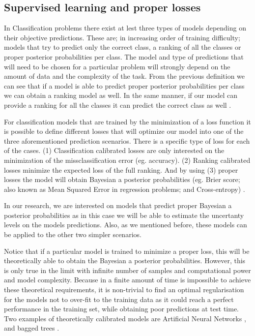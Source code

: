 \documentclass[a4paper, 12pt]{article}
\begin{document}
\subsection{Supervised learning and proper losses}
\label{sec:full:sup}

In Classification problems there exist at lest three types of models depending on their objective predictions.
These are; in increasing order of training difficulty; models that try to predict only the correct class, a ranking of all the classes or proper posterior probabilities per class.
The model and type of predictions that will need to be chosen for a particular problem will strongly depend on the amount of data and the complexity of the task.
From the previous definition we can see that if a model is able to predict proper posterior probabilities per class we can obtain a ranking model as well.
In the same manner, if our model can provide a ranking for all the classes it can predict the correct class as well \cite{Cid-sueiro2012}.

For classification models that are trained by the minimization of a loss function it is possible to define different losses that will optimize our model into one of the three aforementioned prediction scenarios.
There is a specific type of loss for each of the cases. (1) Classification calibrated losses are only interested on the minimization of the missclassification error (eg. accuracy).
(2) Ranking calibrated losses minimize the expected loss of the full ranking.
And by using (3) proper losses the model will obtain Bayesian a posterior probabilities (eg. Brier score; also known as Mean Squared Error in regression problems; and Cross-entropy) \cite{Buja2005}.

In our research, we are interested on models that predict proper Bayesian a posterior probabilities as in this case we will be able to estimate the uncertanty levels on the models predictions.
Also, as we mentioned before, these models can be applied to the other two simpler scenarios.

Notice that if a particular model is trained to minimize a proper loss, this will be theoretically able to obtain the Bayesian a posterior probabilities.
However, this is only true in the limit with infinite number of samples and computational power and model complexity.
Because in a finite amount of time is impossible to achieve these theoretical requirements, it is non-trivial to find an optimal regularisation for the models not to over-fit to the training data as it could reach a perfect performance in the training set, while obtaining poor predictions at test time.
Two examples of theoretically calibrated models are Artificial Neural Networks \cite{Hung1996, zhang2000}, and bagged trees \cite{Niculescu-Mizil2005}.
\end{document}
